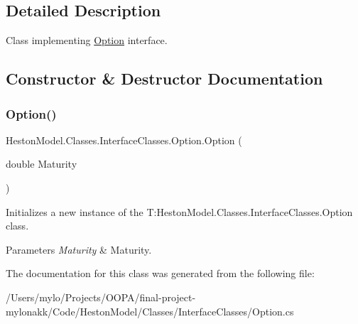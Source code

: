 \subsection{Detailed Description}
Class implementing \mbox{\hyperlink{class_heston_model_1_1_classes_1_1_interface_classes_1_1_option}{Option}} interface. 



\subsection{Constructor \& Destructor Documentation}
\mbox{\label{class_heston_model_1_1_classes_1_1_interface_classes_1_1_option_ad67f6a726c6cba37c85104bc9240844a}} 
\subsubsection{\texorpdfstring{Option()}{Option()}}
{\footnotesize\ttfamily Heston\+Model.\+Classes.\+Interface\+Classes.\+Option.\+Option (\begin{DoxyParamCaption}\item[{double}]{Maturity }\end{DoxyParamCaption})\hspace{0.3cm}{\ttfamily [inline]}}



Initializes a new instance of the T\+:\+Heston\+Model.\+Classes.\+Interface\+Classes.\+Option class. 


\begin{DoxyParams}{Parameters}
{\em Maturity} & Maturity.\\
\hline
\end{DoxyParams}


The documentation for this class was generated from the following file\+:\begin{DoxyCompactItemize}
\item 
/\+Users/mylo/\+Projects/\+O\+O\+P\+A/final-\/project-\/mylonakk/\+Code/\+Heston\+Model/\+Classes/\+Interface\+Classes/Option.\+cs\end{DoxyCompactItemize}
